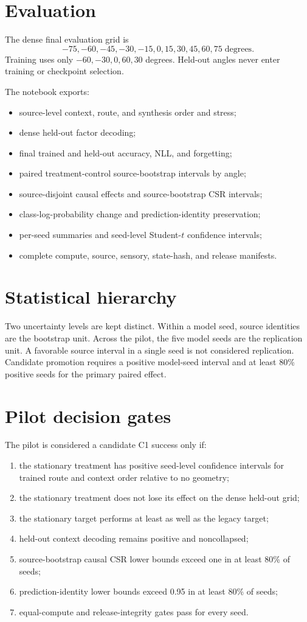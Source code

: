\documentclass[10pt]{article}
\begin{document}
\section{Evaluation}
The dense final evaluation grid is
\[
-75,-60,-45,-30,-15,0,15,30,45,60,75\;\text{degrees}.
\]
Training uses only $-60,-30,0,60,30$ degrees. Held-out angles never enter training or checkpoint selection.

The notebook exports:
\begin{itemize}
\item source-level context, route, and synthesis order and stress;
\item dense held-out factor decoding;
\item final trained and held-out accuracy, NLL, and forgetting;
\item paired treatment-control source-bootstrap intervals by angle;
\item source-disjoint causal effects and source-bootstrap CSR intervals;
\item class-log-probability change and prediction-identity preservation;
\item per-seed summaries and seed-level Student-$t$ confidence intervals;
\item complete compute, source, sensory, state-hash, and release manifests.
\end{itemize}

\section{Statistical hierarchy}
Two uncertainty levels are kept distinct. Within a model seed, source identities are the bootstrap unit. Across the pilot, the five model seeds are the replication unit. A favorable source interval in a single seed is not considered replication. Candidate promotion requires a positive model-seed interval and at least 80\% positive seeds for the primary paired effect.

\section{Pilot decision gates}
The pilot is considered a candidate C1 success only if:
\begin{enumerate}
\item the stationary treatment has positive seed-level confidence intervals for trained route and context order relative to no geometry;
\item the stationary treatment does not lose its effect on the dense held-out grid;
\item the stationary target performs at least as well as the legacy target;
\item held-out context decoding remains positive and noncollapsed;
\item source-bootstrap causal CSR lower bounds exceed one in at least 80\% of seeds;
\item prediction-identity lower bounds exceed 0.95 in at least 80\% of seeds;
\item equal-compute and release-integrity gates pass for every seed.
\end{enumerate}
\end{document}

